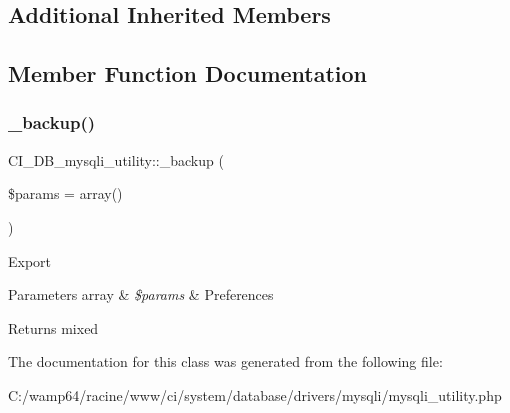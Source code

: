 \subsection*{Additional Inherited Members}


\subsection{Member Function Documentation}
\mbox{\label{class_c_i___d_b__mysqli__utility_a777a35b2ed62ac0c697f2bb66b697ca3}} 
\subsubsection{\texorpdfstring{\+\_\+backup()}{\_backup()}}
{\footnotesize\ttfamily C\+I\+\_\+\+D\+B\+\_\+mysqli\+\_\+utility\+::\+\_\+backup (\begin{DoxyParamCaption}\item[{}]{\$params = {\ttfamily array()} }\end{DoxyParamCaption})\hspace{0.3cm}{\ttfamily [protected]}}

Export


\begin{DoxyParams}[1]{Parameters}
array & {\em \$params} & Preferences \\
\hline
\end{DoxyParams}
\begin{DoxyReturn}{Returns}
mixed 
\end{DoxyReturn}


The documentation for this class was generated from the following file\+:\begin{DoxyCompactItemize}
\item 
C\+:/wamp64/racine/www/ci/system/database/drivers/mysqli/mysqli\+\_\+utility.\+php\end{DoxyCompactItemize}
